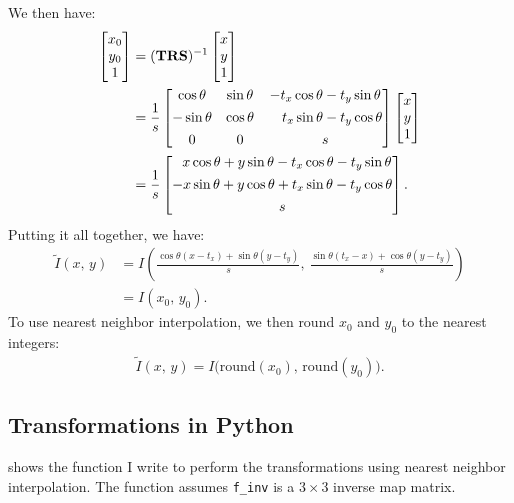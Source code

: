 We then have:
\begin{align*}
  \begin{bmatrix}x_0\\y_0\\1\end{bmatrix} &= (\mathbf{TRS})^{-1}\begin{bmatrix}x\\y\\1\end{bmatrix}\\
  &=
  \frac 1 s 
  \begin{bmatrix}\cos \theta   & \sin \theta & -t_x \cos \theta -t_y \sin \theta \\[4pt]
  - \sin \theta & \cos \theta &\quad t_x \sin \theta - t_y \cos \theta\\[4pt]
  0 & 0 & s
  \end{bmatrix} \begin{bmatrix}x\\y\\1\end{bmatrix}\\
  &=
  \frac 1 s
  \begin{bmatrix}\ \  x \cos \theta + y \sin \theta  - t_x \cos \theta -t_y \sin  \theta\\[4pt]
       -x \sin \theta + y \cos \theta + t_x \sin \theta - t_y \cos \theta\\[4pt]
       s
      \end{bmatrix}.\\
\end{align*}
Putting it all together, we have:
\begin{align*}
  \tilde{I}(x,\, y)
  &= I\left(
  \frac {\cos \theta(x - t_x)  + \sin \theta (y - t_y)} s ,\
  \frac {\sin \theta (t_x - x) + \cos \theta (y - t_y)} s 
      \right)\\
      &= I(x_0,\, y_0).
\end{align*}
To use nearest neighbor interpolation, we then round $x_0$ and $y_0$ to the
nearest integers:
\begin{align*}
  \tilde{I}(x,\, y) = I\big(\text{round}(x_0),\, \text{round}(y_0)\big).
\end{align*}

\subsection{Transformations in Python}

 shows the function I write to perform the transformations
using nearest neighbor interpolation. The function assumes \texttt{f\_inv} is a
$3 \times 3$ inverse map matrix.

